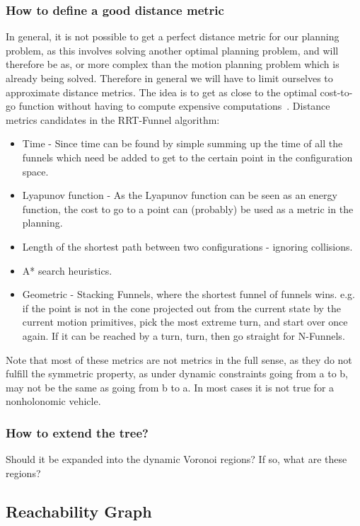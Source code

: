 \subsubsection{How to define a good distance metric}
In general, it is not possible to get a perfect distance metric for our planning
problem, as this involves solving another optimal planning problem, and will
therefore be as, or more complex than the motion planning problem which is
already being solved. Therefore in general we will have to limit ourselves to
approximate distance metrics. The idea is to get as close to the optimal
cost-to-go function without having to compute expensive
computations~\cite{Lav06}. Distance metrics candidates in the RRT-Funnel
algorithm:
\begin{itemize}
\item Time - Since time can be found by simple summing up the time of all the
  funnels which need be added to get to the certain point in the configuration
  space.
\item Lyapunov function - As the Lyapunov function can be seen as an energy
  function, the cost to go to a point can (probably) be used as a metric in the
  planning.
\item Length of the shortest path between two configurations - ignoring
  collisions.
\item A* search heuristics.
\item Geometric - Stacking Funnels, where the shortest funnel of funnels wins.
  e.g. if the point is not in the cone projected out from the current state by
  the current motion primitives, pick the most extreme turn, and start over once
  again. If it can be reached by a turn, turn, then go straight for N-Funnels.
\end{itemize}

Note that most of these metrics are not metrics in the full sense, as they do
not fulfill the symmetric property, as under dynamic constraints going from a to
b, may not be the same as going from b to a. In most cases it is not true for a
nonholonomic vehicle.

\subsubsection{How to extend the tree?}

Should it be expanded into the dynamic Voronoi regions? If so, what are these
regions?


\subsection{Reachability Graph}


